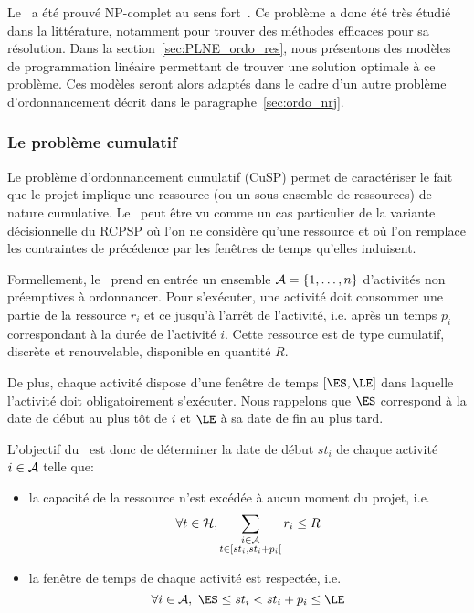 Le \RCPSP~a été prouvé NP-complet au sens
fort~\cite{NP_RCPSP}. Ce problème a donc été très étudié dans la
littérature, notamment pour trouver des méthodes efficaces pour sa
résolution. Dans la section~\ref{sec:PLNE_ordo_res}, nous présentons des
modèles de programmation linéaire permettant de trouver une solution
optimale à ce problème. Ces modèles seront alors adaptés dans le cadre
d'un autre problème d'ordonnancement décrit dans le
paragraphe~\ref{sec:ordo_nrj}. 

\subsubsection{Le problème cumulatif}

Le problème d'ordonnancement cumulatif (CuSP) permet de caractériser
le fait que le projet implique une ressource (ou un sous-ensemble de
ressources) de nature cumulative. Le \CUSP~peut être vu comme un cas
particulier de la variante décisionnelle du RCPSP où l'on ne considère
qu'une ressource et où l'on remplace les contraintes de précédence par
les fenêtres de temps qu'elles induisent.

Formellement, le \CUSP~prend en entrée un ensemble $ {\cal A}=\{1,\dots,n\}$
d'activités non préemptives à ordonnancer. Pour s'exécuter, une
activité doit consommer une partie de la ressource $r_i$ et ce jusqu'à
l'arrêt de l'activité, i.e. après un temps $p_i$ correspondant à la
durée de l'activité $i$. Cette ressource est de type cumulatif,
discrète et renouvelable, disponible en quantité $R$.

De plus, chaque activité dispose d'une fenêtre de temps $[\ES,\LE]$
dans laquelle l'activité doit obligatoirement s'exécuter. Nous
rappelons que $\ES$ correspond à la date de début au plus tôt de $i$
et $\LE$ à sa date de fin au plus tard.

L'objectif du \CUSP~est donc de déterminer la date de début $st_i$ de
chaque activité $i \in {\cal A}$ telle que:
\begin{itemize}
\item la capacité de la ressource n'est excédée à aucun moment du
  projet, i.e.
  \begin{equation} \forall t \in {\cal H},\sum_{\substack{i\in {\cal A}\\ t \in
        [st_i,st_i+p_i[}} r_{i} \le  R
\label{eq:CUSP_res}
\end{equation}
\item la fenêtre de temps de chaque activité est respectée, i.e. 
  \begin{equation} \forall i \in \A,\ \ES \le st_i < st_i+p_i \le \LE \end{equation}
\end{itemize}


